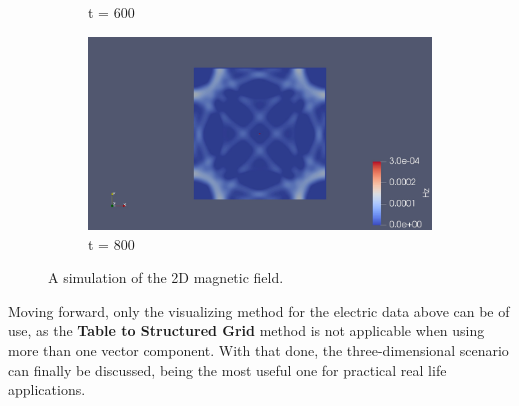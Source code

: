 \begin{figure}[h!]
\begin{subfigure}{.49\textwidth}
		\caption{t = 600}
	\end{subfigure}
	\begin{subfigure}{.49\textwidth}
		\centering
		\includegraphics[width=.95\linewidth]{Figures/FDTD2DH4}
		\caption{t = 800}
	\end{subfigure}
	\decoRule
	\caption[2D Magnetic Field Simulation]{A simulation of the 2D magnetic field.}
	\label{fig:FDTD2DH}
\end{figure}

Moving forward, only the visualizing method for the electric data above can be of use, as the \textbf{Table to Structured Grid} method is not applicable when using more than one vector component. With that done, the three-dimensional scenario can finally be discussed, being the most useful one for practical real life applications.